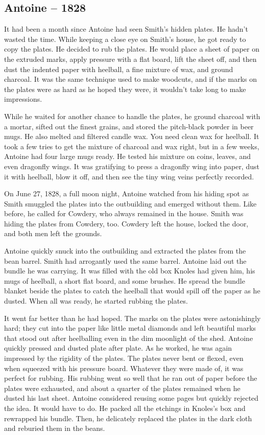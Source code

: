 \hypertarget{antoine-1828-2}{%
\subsection*{Antoine -- 1828}\label{antoine-1828-2}}

It had been a month since Antoine had seen Smith's hidden plates. He
hadn't wasted the time. While keeping a close eye on Smith's house, he
got ready to copy the plates. He decided to rub the plates. He would
place a sheet of paper on the extruded marks, apply pressure with a flat
board, lift the sheet off, and then dust the indented paper with
heelball, a fine mixture of wax, and ground charcoal. It was the same
technique used to make woodcuts, and if the marks on the plates were as
hard as he hoped they were, it wouldn't take long to make impressions.

While he waited for another chance to handle the plates, he ground
charcoal with a mortar, sifted out the finest grains, and stored the
pitch-black powder in beer mugs. He also melted and filtered candle wax.
You need clean wax for heelball. It took a few tries to get the mixture
of charcoal and wax right, but in a few weeks, Antoine had four large
mugs ready. He tested his mixture on coins, leaves, and even dragonfly
wings. It was gratifying to press a dragonfly wing into paper, dust it
with heelball, blow it off, and then see the tiny wing veins perfectly
recorded.

On June 27, 1828, a full moon night, Antoine watched from his hiding
spot as Smith smuggled the plates into the outbuilding and emerged
without them. Like before, he called for Cowdery, who always remained in
the house. Smith was hiding the plates from Cowdery, too. Cowdery left
the house, locked the door, and both men left the grounds.

Antoine quickly snuck into the outbuilding and extracted the plates from
the bean barrel. Smith had arrogantly used the same barrel. Antoine laid
out the bundle he was carrying. It was filled with the old box Knoles
had given him, his mugs of heelball, a short flat board, and some
brushes. He spread the bundle blanket beside the plates to catch the
heelball that would spill off the paper as he dusted. When all was
ready, he started rubbing the plates.

It went far better than he had hoped. The marks on the plates were
astonishingly hard; they cut into the paper like little metal diamonds
and left beautiful marks that stood out after heelballing even in the
dim moonlight of the shed. Antoine quickly pressed and dusted plate
after plate. As he worked, he was again impressed by the rigidity of the
plates. The plates never bent or flexed, even when squeezed with his
pressure board. Whatever they were made of, it was perfect for rubbing.
His rubbing went so well that he ran out of paper before the plates were
exhausted, and about a quarter of the plates remained when he dusted his
last sheet. Antoine considered reusing some pages but quickly rejected
the idea. It would have to do. He packed all the etchings in Knoles's
box and rewrapped his bundle. Then, he delicately replaced the plates in
the dark cloth and reburied them in the beans.


